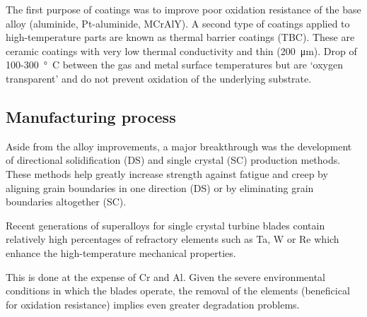 The first purpose of coatings was to improve poor oxidation resistance of the base alloy (aluminide, Pt-aluminide, MCrAlY). A second type of coatings applied to high-temperature parts are known as thermal barrier coatings (TBC). These are ceramic coatings with very low thermal conductivity and thin (\SI{200}{\micro\meter}). Drop of 100-\SI{300}{\degree C} between the gas and metal surface temperatures but are `oxygen transparent' and do not prevent oxidation of the underlying substrate.
\subsection{Manufacturing process}
Aside from the alloy improvements, a major breakthrough was the development of directional solidification (DS) and single crystal (SC) production methods. These methods help greatly increase strength against fatigue and creep by aligning grain boundaries in one direction (DS) or by eliminating grain boundaries altogether (SC).

Recent generations of superalloys for single crystal turbine blades contain relatively high percentages of refractory elements such as Ta, W or Re which enhance the high-temperature mechanical properties. 

This is done at the expense of Cr and Al. Given the severe environmental conditions in which the blades operate, the removal of the elements (beneficical for oxidation resistance) implies even greater degradation problems. 

